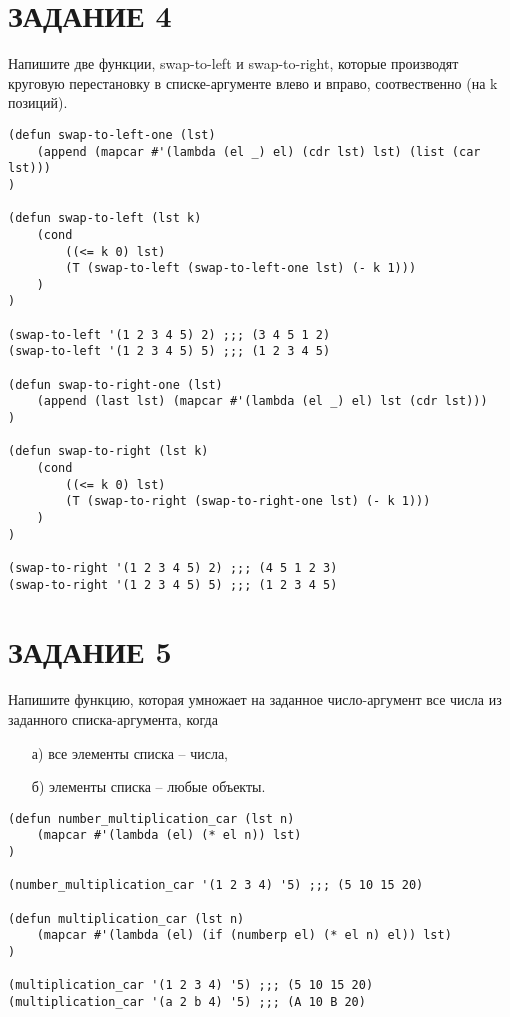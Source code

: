 \section{ЗАДАНИЕ 4}

Напишите две функции, swap-to-left и swap-to-right, которые производят круговую
перестановку в списке-аргументе влево и вправо, соотвественно (на k позиций).

\begin{lstlisting}
(defun swap-to-left-one (lst)
    (append (mapcar #'(lambda (el _) el) (cdr lst) lst) (list (car lst)))
)

(defun swap-to-left (lst k)
    (cond
        ((<= k 0) lst)
        (T (swap-to-left (swap-to-left-one lst) (- k 1)))
    )
)

(swap-to-left '(1 2 3 4 5) 2) ;;; (3 4 5 1 2)
(swap-to-left '(1 2 3 4 5) 5) ;;; (1 2 3 4 5)

(defun swap-to-right-one (lst)
    (append (last lst) (mapcar #'(lambda (el _) el) lst (cdr lst)))
)

(defun swap-to-right (lst k)
    (cond
        ((<= k 0) lst)
        (T (swap-to-right (swap-to-right-one lst) (- k 1)))
    )
)

(swap-to-right '(1 2 3 4 5) 2) ;;; (4 5 1 2 3)
(swap-to-right '(1 2 3 4 5) 5) ;;; (1 2 3 4 5)
\end{lstlisting}

\section{ЗАДАНИЕ 5}

Напишите функцию, которая умножает на заданное число-аргумент
все числа из заданного списка-аргумента, когда

\begin{enumerate}
    \item[а)] все элементы списка -- числа,
    \item[б)] элементы списка -- любые объекты.
\end{enumerate}

\begin{lstlisting}
(defun number_multiplication_car (lst n)
    (mapcar #'(lambda (el) (* el n)) lst)
)

(number_multiplication_car '(1 2 3 4) '5) ;;; (5 10 15 20)

(defun multiplication_car (lst n)
    (mapcar #'(lambda (el) (if (numberp el) (* el n) el)) lst)
)

(multiplication_car '(1 2 3 4) '5) ;;; (5 10 15 20)
(multiplication_car '(a 2 b 4) '5) ;;; (A 10 B 20)
\end{lstlisting}

